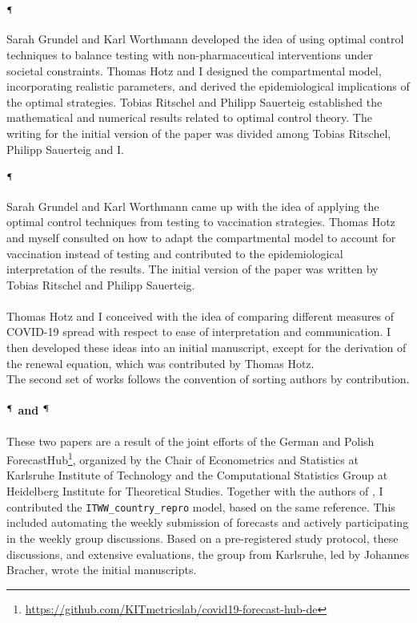 \begin{refsection}
\paragraph{\cite{Grundel2022How}$^{\mathparagraph}$}
Sarah Grundel and Karl Worthmann developed the idea of using optimal control techniques to balance testing with non-pharmaceutical interventions under societal constraints.
Thomas Hotz and I designed the compartmental model, incorporating realistic parameters, and derived the epidemiological implications of the optimal strategies. 
Tobias Ritschel and Philipp Sauerteig established the mathematical and numerical results related to optimal control theory.
The writing for the initial version of the paper was divided among Tobias Ritschel, Philipp Sauerteig and I. 

\paragraph{\cite{Grundel2021How}$^{\mathparagraph}$}
Sarah Grundel and Karl Worthmann came up with the idea of applying the optimal control techniques from testing to vaccination strategies. Thomas Hotz and myself consulted on how to adapt the compartmental model to account for vaccination instead of testing and contributed to the epidemiological interpretation of the results. The initial version of the paper was written by Tobias Ritschel and Philipp Sauerteig.

\paragraph{\cite{Heyder2023Measures}}
Thomas Hotz and I conceived with the idea of comparing different measures of COVID-19 spread with respect to ease of interpretation and communication. I then developed these ideas into an initial manuscript, except for the derivation of the renewal equation, which was contributed by Thomas Hotz. \\[18pt]

The second set of works follows the convention of sorting authors by contribution.

\paragraph{\cite{Bracher2021Preregistered}$^\mathparagraph$ and \cite{Bracher2022National}$^\mathparagraph$}
These two papers are a result of the joint efforts of the German and Polish ForecastHub\footnote{\url{https://github.com/KITmetricslab/covid19-forecast-hub-de}}, organized by the Chair of Econometrics and Statistics at Karlsruhe Institute of Technology and the Computational Statistics Group at Heidelberg Institute for Theoretical Studies. Together with the authors of \citep{Burgard2021Regional}, I contributed the \texttt{ITWW\_country\_repro} model, based on the same reference. This included automating the weekly submission of forecasts and actively participating in the weekly group discussions. Based on a pre-registered study protocol, these discussions, and extensive evaluations, the group from Karlsruhe, led by Johannes Bracher, wrote the initial manuscripts.


\end{refsection}
